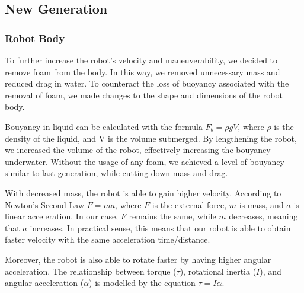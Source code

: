 \documentclass[11pt, oneside]{article}   	%
\begin{document}
\subsection{New Generation}
\subsubsection*{Robot Body}
	To further increase the robot's velocity and maneuverability, we decided to remove foam from the body. In this way, we removed unnecessary mass and reduced drag in water. To counteract the loss of buoyancy associated with the removal of foam, we made changes to the shape and dimensions of the robot body.

	Bouyancy in liquid can be calculated with the formula $F_b=\rho g V$, where $\rho$ is the density of the liquid, and V is the volume submerged. By lengthening the robot, we increased the volume of the robot, effectively increasing the bouyancy underwater. Without the usage of any foam, we achieved a level of bouyancy similar to last generation, while cutting down mass and drag.

\begin{center}
\end{center}

	With decreased mass, the robot is able to gain higher velocity. According to Newton's Second Law $F=ma$, where $F$ is the external force, $m$ is mass, and $a$ is linear acceleration. In our case, $F$ remains the same, while $m$ decreases, meaning that $a$ increases. In practical sense, this means that our robot is able to obtain faster velocity with the same acceleration time/distance.

	Moreover, the robot is also able to rotate faster by having higher angular acceleration. The relationship between torque ($\tau$), rotational inertia ($I$), and angular acceleration ($\alpha$) is modelled by the equation $\tau=I \alpha$.
\end{document}
